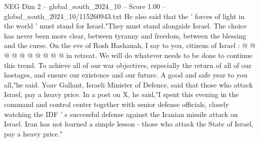 \begin{textsample}{NEG Dim 2 – global\_south\_2024\_10 – Score 1.00 – global\_south\_2024\_10/115260943.txt}
He also said that the ' forces of light in the world ' must stand for Israel."They must stand alongside Israel.
The choice has never been more clear, between tyranny and freedom, between the blessing and the curse.
On the eve of Rosh Hashanah, I say to you, citizens of Israel : @ @ @ @ @ @ @ @ @ @ in retreat.
We will do whatever needs to be done to continue this trend.
To achieve all of our war objectives, especially the return of all of our hostages, and ensure our existence and our future.
A good and safe year to you all,"he said.
Yoav Gallant, Israeli Minister of Defence, said that those who attack Israel, pay a heavy price.
In a post on X, he said,"I spent this evening in the command and control center together with senior defense officials, closely watching the IDF ' s successful defense against the Iranian missile attack on Israel.
Iran has not learned a simple lesson - those who attack the State of Israel, pay a heavy price."

\end{textsample}
